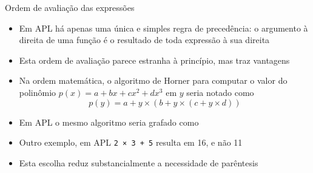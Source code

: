 \begin{frame}[fragile]{Ordem de avaliação das expressões}

    \begin{itemize}
        \item Em APL há apenas uma única e simples regra de precedência: o argumento à direita de uma função é o resultado de toda expressão à sua direita
        \pause

        \item Esta ordem de avaliação parece estranha à princípio, mas traz vantagens
        \pause

        \item Na ordem matemática, o algoritmo de Horner para computar o valor do polinômio $p(x) = a + bx + cx^2 + dx^3$ em $y$ seria notado como
        \[
            p(y) = a + y \times (b + y \times (c + y \times d))
        \]

        \pause \item Em APL o mesmo algoritmo seria grafado como

        \pause

        \item Outro exemplo, em APL \texttt{2 × 3 + 5} resulta em 16, e não 11
        \pause

        \item Esta escolha reduz substancialmente a necessidade de parêntesis
    \end{itemize}

\end{frame}

